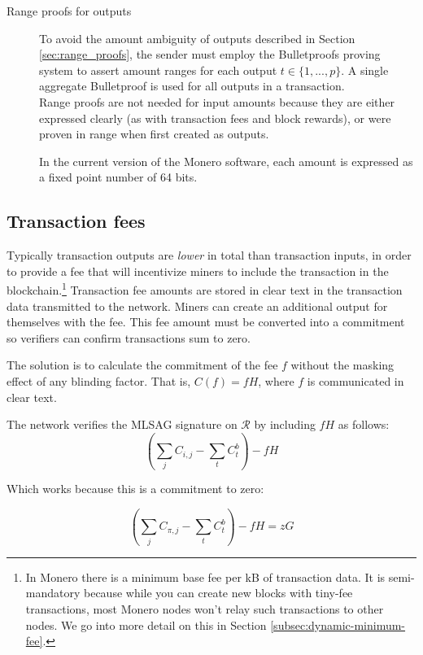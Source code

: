 \begin{description}
	\item[Range proofs for outputs]
	To avoid the amount ambiguity of outputs described in Section  \ref{sec:range_proofs}, the sender must employ the Bulletproofs proving system to assert amount ranges for each output $t \in \{1, ..., p\}$. A single aggregate Bulletproof is used for all outputs in a transaction. \\
	
	Range proofs are not needed for input amounts because they are either expressed clearly (as with transaction fees and block rewards), or were proven in range when first created as outputs.
	
	In the current version of the Monero software, each amount is expressed as a fixed point number of 64 bits.
	
\end{description}


\subsection{Transaction fees}

Typically transaction outputs are {\em lower} in total than transaction inputs, in order to provide a fee that will incentivize miners to include the transaction in the blockchain.\footnote{In Monero there is a minimum base fee per kB of transaction data. It is semi-mandatory because while you can create new blocks with tiny-fee transactions, most Monero nodes won't relay such transactions to other nodes. We go into more detail on this in Section \ref{subsec:dynamic-minimum-fee}.} Transaction fee amounts are stored in clear text in the transaction data transmitted to the network. Miners can create an additional output for themselves with the fee. This fee amount must be converted into a commitment so verifiers can confirm transactions sum to zero.

The solution is to calculate the commitment of the fee $f$ without the masking effect of any blinding factor. That is, $C(f) = f H$, where $f$ is communicated in clear text.

The network verifies the MLSAG signature on $\mathcal{R}$ by including $f H$ as follows:\\
\[ (\sum\limits_j C_{i, j} - \sum\limits_t C^b_{t}) - f H\]

Which works because this is a commitment to zero:

\[ (\sum\limits_j C_{\pi, j} - \sum\limits_t C^b_{t}) - f H = z G\]


